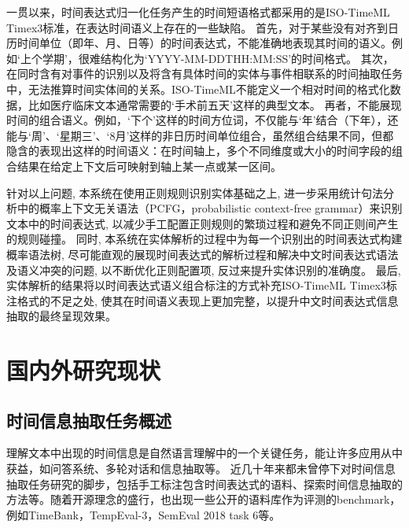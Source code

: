 一贯以来，时间表达式归一化任务产生的时间短语格式都采用的是ISO-TimeML Timex3标准，在表达时间语义上存在的一些缺陷。
首先，对于某些没有对齐到日历时间单位（即年、月、日等）的时间表达式，不能准确地表现其时间的语义。例如‘上个学期’，很难结构化为‘YYYY-MM-DDTHH:MM:SS’的时间格式。
其次，在同时含有对事件的识别以及将含有具体时间的实体与事件相联系的时间抽取任务中，无法推算时间实体间的关系。ISO-TimeML不能定义一个相对时间的格式化数据，比如医疗临床文本通常需要的‘手术前五天’这样的典型文本。
再者，不能展现时间的组合语义。例如，‘下个’这样的时间方位词，不仅能与‘年’结合（下年），还能与‘周’、‘星期三’、‘8月’这样的非日历时间单位组合，虽然组合结果不同，但都隐含的表现出这样的时间语义：在时间轴上，多个不同维度或大小的时间字段的组合结果在给定上下文后可映射到轴上某一点或某一区间。

针对以上问题, 本系统在使用正则规则识别实体基础之上, 进一步采用统计句法分析中的概率上下文无关语法（PCFG，probabilistic context-free grammar）来识别文本中的时间表达式,
以减少手工配置正则规则的繁琐过程和避免不同正则间产生的规则碰撞。
同时, 本系统在实体解析的过程中为每一个识别出的时间表达式构建概率语法树, 尽可能直观的展现时间表达式的解析过程和解决中文时间表达式语法及语义冲突的问题, 以不断优化正则配置项, 反过来提升实体识别的准确度。
最后, 实体解析的结果将以时间表达式语义组合标注的方式补充ISO-TimeML Timex3标注格式的不足之处, 使其在时间语义表现上更加完整，以提升中文时间表达式信息抽取的最终呈现效果。



\section{国内外研究现状}

\subsection{时间信息抽取任务概述}

理解文本中出现的时间信息是自然语言理解中的一个关键任务，能让许多应用从中获益，如问答系统、多轮对话和信息抽取等。
近几十年来都未曾停下对时间信息抽取任务研究的脚步，包括手工标注包含时间表达式的语料、探索时间信息抽取的方法等。随着开源理念的盛行，也出现一些公开的语料库作为评测的benchmark，
例如TimeBank\cite{Pustejovsky03}，TempEval-3\cite{uzzaman-etal-2013-semeval}，SemEval 2018 task 6\cite{laparra-etal-2018-semeval}等。


